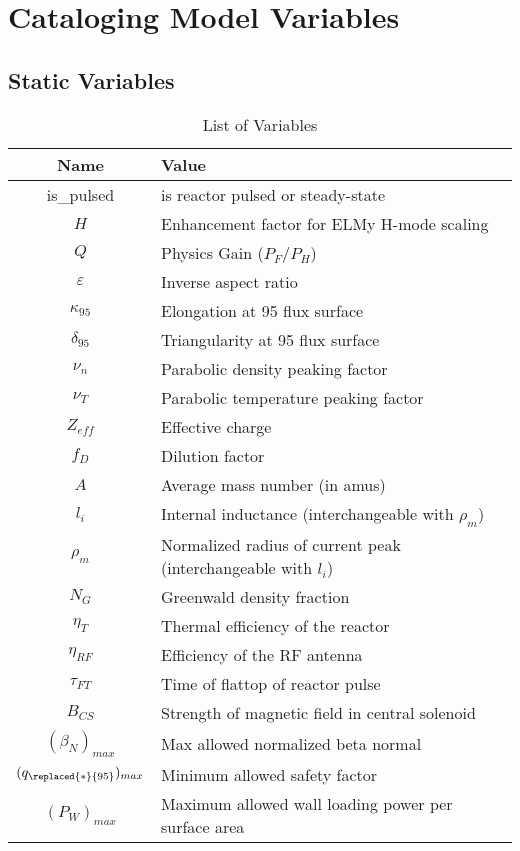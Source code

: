 \chapter{Cataloging Model Variables}

\section{Static Variables}

\label{chapter:var_table}

\begin{table}[h]
\centering
\caption{List of  Variables}
\begin{tabular}{c|l}
\textbf{Name} & \textbf{Value} \\
\hline
is\_pulsed & is reactor pulsed or steady-state \\
$H$ & Enhancement factor for ELMy H-mode scaling \\
$Q$ & Physics Gain ($P_F/P_H$) \\
$\varepsilon$ & Inverse aspect ratio \\
$\kappa_{95}$ &  Elongation at 95 flux surface \\
$\delta_{95}$ &  Triangularity at 95 flux surface \\
$\nu_n$ &  Parabolic density peaking factor \\
$\nu_T$ &  Parabolic temperature peaking factor \\
$Z_{eff}$ & Effective charge \\
$f_D$ & Dilution factor \\
$A$ & Average mass number (in amus) \\
$l_i$ & Internal inductance (interchangeable with $\rho_m$) \\
$\rho_m$ & Normalized radius of current peak (interchangeable with $l_i$) \\
$N_G$ & Greenwald density fraction \\
$\eta_T$ & Thermal efficiency of the reactor \\
$\eta_{RF}$ &  Efficiency of the RF antenna \\
$\tau_{FT}$ &  Time of flattop of reactor pulse \\
$B_{CS}$ &  Strength of magnetic field in central solenoid \\
$(\beta_N)_{max}$ &  Max allowed normalized beta normal \\
$(q_{\replaced{*}{95}})_{max}$ & Minimum allowed safety factor \\
$(P_W)_{max}$ & Maximum allowed wall loading power per surface area
\end{tabular}
\end{table}

